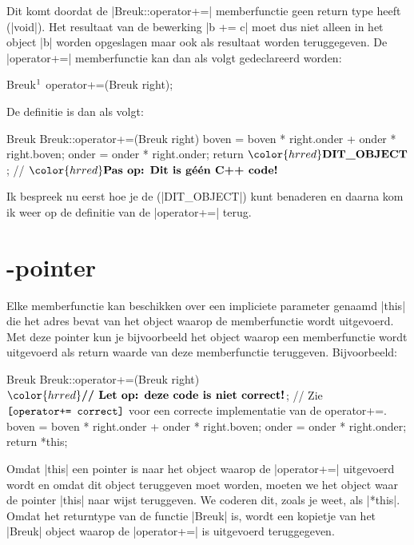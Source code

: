 \begin{cpplstShortInline}
Dit komt doordat de |Breuk::operator+=| memberfunctie geen return type heeft (|void|). 
Het resultaat van de bewerking |b += c| moet dus niet alleen in het object |b| worden opgeslagen maar ook als resultaat worden teruggegeven. 
De |operator+=| memberfunctie kan dan als volgt gedeclareerd worden:

\label{operator+= niet correct}
\begin{cpplstfragment}[mathescape=true]
    Breuk$\footnotemark$ operator+=(Breuk right);
\end{cpplstfragment}


De definitie is dan als volgt:

\begin{cpplstfragment}[mathescape=true]
Breuk Breuk::operator+=(Breuk right) {
    boven = boven * right.onder + onder * right.boven;
    onder = onder * right.onder;
    return $\color{hrred}\textbf{DIT\_OBJECT} $; // $\color{hrred}\textbf{Pas op: Dit is géén C++ code!}$
}
\end{cpplstfragment}

Ik bespreek nu eerst hoe je de  (|DIT_OBJECT|) kunt benaderen en daarna kom ik weer op de definitie van de |operator+=| terug.

\section[\texttt{this}-pointer]{\texorpdfstring{}{this}-pointer}
Elke memberfunctie kan beschikken over een impliciete parameter genaamd \label{this}|this| die het adres bevat van het object waarop de memberfunctie wordt uitgevoerd. 
Met deze pointer kun je bijvoorbeeld het object waarop een memberfunctie wordt uitgevoerd als return waarde van deze memberfunctie teruggeven.
Bijvoorbeeld:
\label{operator+= nog niet correct}
\begin{cpplstfragment}[mathescape=true]
Breuk Breuk::operator+=(Breuk right) { $\color{hrred}\textbf{// Let op: deze code is niet correct!}$; 
// Zie $\texttt{\cref{operator+= correct}}$ voor een correcte implementatie van de operator+=.
    boven = boven * right.onder + onder * right.boven;
    onder = onder * right.onder;
    return *this;
}
\end{cpplstfragment}

Omdat |this| een pointer is naar het object waarop de |operator+=| uitgevoerd wordt en omdat dit object teruggeven moet worden, moeten we het object waar de pointer |this| naar wijst teruggeven. We coderen dit, zoals je weet, als |*this|. Omdat het returntype van de functie |Breuk| is, wordt een kopietje van het |Breuk| object waarop de |operator+=| is uitgevoerd teruggegeven. 


\end{cpplstShortInline}
